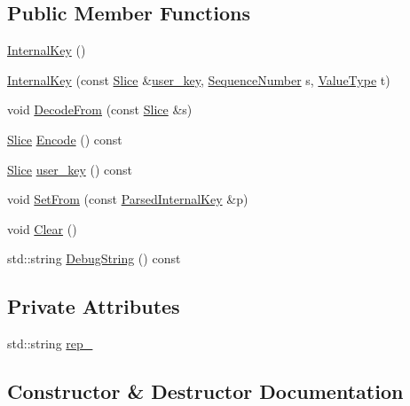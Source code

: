 \subsection*{Public Member Functions}
\begin{DoxyCompactItemize}
\item 
\hyperlink{classleveldb_1_1_internal_key_a277b997aadb14d0a65314187a1e6adf6}{Internal\+Key} ()
\item 
\hyperlink{classleveldb_1_1_internal_key_af436814d1667db55e93b6bd583619617}{Internal\+Key} (const \hyperlink{classleveldb_1_1_slice}{Slice} \&\hyperlink{classleveldb_1_1_internal_key_a8eeee76862e806006549784fe21fff61}{user\+\_\+key}, \hyperlink{namespaceleveldb_a5481ededd221c36d652c371249f869fa}{Sequence\+Number} s, \hyperlink{namespaceleveldb_acc038cb0d608414730cafa459a4ba866}{Value\+Type} t)
\item 
void \hyperlink{classleveldb_1_1_internal_key_a5a8c9bced0ba968b6b62d91cfb19a82a}{Decode\+From} (const \hyperlink{classleveldb_1_1_slice}{Slice} \&s)
\item 
\hyperlink{classleveldb_1_1_slice}{Slice} \hyperlink{classleveldb_1_1_internal_key_aed986eb7cb360bd6955097235ad267b6}{Encode} () const 
\item 
\hyperlink{classleveldb_1_1_slice}{Slice} \hyperlink{classleveldb_1_1_internal_key_a8eeee76862e806006549784fe21fff61}{user\+\_\+key} () const 
\item 
void \hyperlink{classleveldb_1_1_internal_key_ada9566cd92b6b9784ab7f2f6f71d0a4e}{Set\+From} (const \hyperlink{structleveldb_1_1_parsed_internal_key}{Parsed\+Internal\+Key} \&p)
\item 
void \hyperlink{classleveldb_1_1_internal_key_ab6e9ebec1bf567de89d8dd34fdc51f86}{Clear} ()
\item 
std\+::string \hyperlink{classleveldb_1_1_internal_key_a737053e1b02c3eb8361e960f7fe5befb}{Debug\+String} () const 
\end{DoxyCompactItemize}
\subsection*{Private Attributes}
\begin{DoxyCompactItemize}
\item 
std\+::string \hyperlink{classleveldb_1_1_internal_key_a8962500b3e5c1f7d2fad13eabdb69368}{rep\+\_\+}
\end{DoxyCompactItemize}


\subsection{Constructor \& Destructor Documentation}
\hypertarget{classleveldb_1_1_internal_key_a277b997aadb14d0a65314187a1e6adf6}{}
